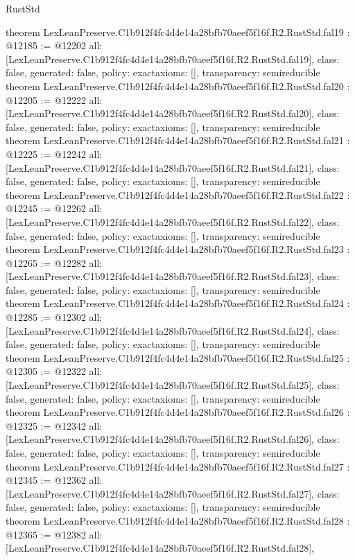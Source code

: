\begin{lexlean}{RustStd}
\begin{coremodule}
{}
theorem LexLeanPreserve.C1b912f4fc4d4e14a28bfb70aeef5f16f.R2.RustStd.fal19 : @12185 := @12202 {
  all: [LexLeanPreserve.C1b912f4fc4d4e14a28bfb70aeef5f16f.R2.RustStd.fal19],
  class: false,
  generated: false,
  policy: exact{axioms: []},
  transparency: semireducible
}
theorem LexLeanPreserve.C1b912f4fc4d4e14a28bfb70aeef5f16f.R2.RustStd.fal20 : @12205 := @12222 {
  all: [LexLeanPreserve.C1b912f4fc4d4e14a28bfb70aeef5f16f.R2.RustStd.fal20],
  class: false,
  generated: false,
  policy: exact{axioms: []},
  transparency: semireducible
}
theorem LexLeanPreserve.C1b912f4fc4d4e14a28bfb70aeef5f16f.R2.RustStd.fal21 : @12225 := @12242 {
  all: [LexLeanPreserve.C1b912f4fc4d4e14a28bfb70aeef5f16f.R2.RustStd.fal21],
  class: false,
  generated: false,
  policy: exact{axioms: []},
  transparency: semireducible
}
theorem LexLeanPreserve.C1b912f4fc4d4e14a28bfb70aeef5f16f.R2.RustStd.fal22 : @12245 := @12262 {
  all: [LexLeanPreserve.C1b912f4fc4d4e14a28bfb70aeef5f16f.R2.RustStd.fal22],
  class: false,
  generated: false,
  policy: exact{axioms: []},
  transparency: semireducible
}
theorem LexLeanPreserve.C1b912f4fc4d4e14a28bfb70aeef5f16f.R2.RustStd.fal23 : @12265 := @12282 {
  all: [LexLeanPreserve.C1b912f4fc4d4e14a28bfb70aeef5f16f.R2.RustStd.fal23],
  class: false,
  generated: false,
  policy: exact{axioms: []},
  transparency: semireducible
}
theorem LexLeanPreserve.C1b912f4fc4d4e14a28bfb70aeef5f16f.R2.RustStd.fal24 : @12285 := @12302 {
  all: [LexLeanPreserve.C1b912f4fc4d4e14a28bfb70aeef5f16f.R2.RustStd.fal24],
  class: false,
  generated: false,
  policy: exact{axioms: []},
  transparency: semireducible
}
theorem LexLeanPreserve.C1b912f4fc4d4e14a28bfb70aeef5f16f.R2.RustStd.fal25 : @12305 := @12322 {
  all: [LexLeanPreserve.C1b912f4fc4d4e14a28bfb70aeef5f16f.R2.RustStd.fal25],
  class: false,
  generated: false,
  policy: exact{axioms: []},
  transparency: semireducible
}
theorem LexLeanPreserve.C1b912f4fc4d4e14a28bfb70aeef5f16f.R2.RustStd.fal26 : @12325 := @12342 {
  all: [LexLeanPreserve.C1b912f4fc4d4e14a28bfb70aeef5f16f.R2.RustStd.fal26],
  class: false,
  generated: false,
  policy: exact{axioms: []},
  transparency: semireducible
}
theorem LexLeanPreserve.C1b912f4fc4d4e14a28bfb70aeef5f16f.R2.RustStd.fal27 : @12345 := @12362 {
  all: [LexLeanPreserve.C1b912f4fc4d4e14a28bfb70aeef5f16f.R2.RustStd.fal27],
  class: false,
  generated: false,
  policy: exact{axioms: []},
  transparency: semireducible
}
theorem LexLeanPreserve.C1b912f4fc4d4e14a28bfb70aeef5f16f.R2.RustStd.fal28 : @12365 := @12382 {
  all: [LexLeanPreserve.C1b912f4fc4d4e14a28bfb70aeef5f16f.R2.RustStd.fal28],
}
\end{coremodule}
\end{lexlean}
